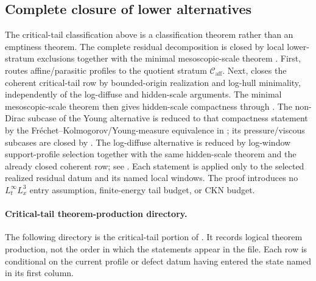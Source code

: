\documentclass[11pt]{amsart}
\numberwithin{equation}{section}
\theoremstyle{plain}
\theoremstyle{definition}
\theoremstyle{remark}
\newcommand{\Caff}{\mathcal C_{\mathrm{aff}}}
\newcommand{\MesoscopicReductionTheorem}{\Cref{thm:first-bad-mesoscopic-reduction}}
\begin{document}
\subsection{Complete closure of lower alternatives}
\label{sec:complete-branch-closure}

The critical-tail classification above is a classification theorem rather than
an emptiness theorem.  The complete residual decomposition is closed by
local lower-stratum exclusions together with the minimal mesoscopic-scale
theorem \MesoscopicReductionTheorem.  First,
 routes affine/parasitic profiles to
the quotient stratum \(\Caff\).  Next,
 closes the coherent critical-tail
row by bounded-origin realization and log-hull minimality, independently of the
log-diffuse and hidden-scale arguments.  The minimal mesoscopic-scale theorem
then gives hidden-scale compactness through
.  The non-Dirac subcase of
the Young alternative is reduced to that compactness statement by the
Fr\'echet--Kolmogorov/Young-measure equivalence in
; its pressure/viscous subcases are
closed by .  The log-diffuse alternative is
reduced by log-window support-profile selection together with the same
hidden-scale theorem and the already closed coherent row; see
.
Each statement is applied only to the selected realized residual datum and its
named local windows.  The proof introduces no \(L^\infty_tL^3_x\) entry
assumption, finite-energy tail budget, or CKN budget.

\paragraph{Critical-tail theorem-production directory.}
The following directory is the critical-tail portion of
.  It records logical theorem production, not
the order in which the statements appear in the file.  Each row is conditional
on the current profile or defect datum having entered the state named in its
first column.
\end{document}
